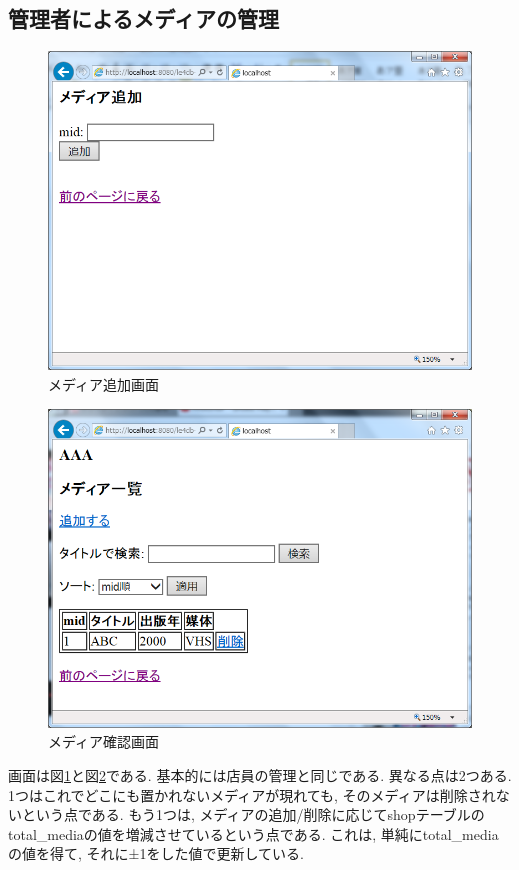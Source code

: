 \documentclass{jarticle}
\begin{document}
\subsection{管理者によるメディアの管理}
\begin{figure}[tp]
\begin{center}
\includegraphics[scale=0.5]{get_media.png}
\end{center}
\caption{メディア追加画面}
\label{fig:get_media}
\end{figure}
\begin{figure}[tp]
\begin{center}
\includegraphics[scale=0.5]{remove_media.png}
\end{center}
\caption{メディア確認画面}
\label{fig:remove_media}
\end{figure}
画面は図\ref{fig:get_media}と図\ref{fig:remove_media}である. 基本的には店員の管理と同じである. 異なる点は2つある. 1つはこれでどこにも置かれないメディアが現れても, そのメディアは削除されないという点である. もう1つは, メディアの追加/削除に応じてshopテーブルのtotal\_mediaの値を増減させているという点である. これは, 単純にtotal\_mediaの値を得て, それに±1をした値で更新している.
\end{document}
